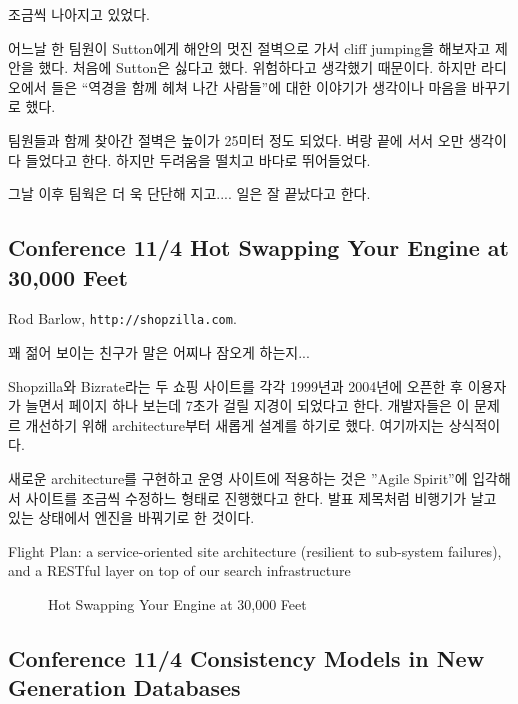\documentclass[a4paper]{article}
\begin{document}
조금씩 나아지고 있었다.
 
어느날 한 팀원이 Sutton에게 해안의 멋진 절벽으로 가서 cliff jumping을
해보자고 제안을 했다. 처음에 Sutton은 싫다고 했다. 위험하다고 생각했기
때문이다.  하지만 라디오에서 들은 ``역경을 함께 헤쳐 나간 사람들''에 대한
이야기가 생각이나 마음을 바꾸기로 했다.
 
팀원들과 함께 찾아간 절벽은 높이가 25미터 정도 되었다. 벼랑 끝에 서서
오만 생각이 다 들었다고 한다. 하지만 두려움을 떨치고 바다로
뛰어들었다.
 
그날 이후 팀웍은 더 욱 단단해 지고.... 일은 잘 끝났다고 한다.
 
\subsection{Conference 11/4 Hot Swapping Your Engine at 30,000 Feet}
 
Rod Barlow, \texttt{http://shopzilla.com}.
 
꽤 젊어 보이는 친구가 말은 어찌나 잠오게 하는지...
 
Shopzilla와 Bizrate라는 두 쇼핑 사이트를 각각 1999년과 2004년에 오픈한
후 이용자가 늘면서 페이지 하나 보는데 7초가 걸릴 지경이 되었다고 한다.
개발자들은 이 문제르 개선하기 위해 architecture부터 새롭게 설계를 하기로 했다.
여기까지는 상식적이다.

새로운 architecture를 구현하고 운영 사이트에 적용하는 것은 ''Agile Spirit''에
입각해서 사이트를 조금씩 수정하느 형태로 진행했다고 한다. 발표 제목처럼
비행기가 날고 있는 상태에서 엔진을 바꿔기로 한 것이다.
 
Flight Plan: a service-oriented site architecture (resilient to
sub-system failures), and a RESTful layer on top of our search
infrastructure

\begin{figure}[t]
    \begin{Frame}
        \begin{center}
        \end{center}
    \end{Frame}
    \caption{Hot Swapping Your Engine at 30,000 Feet}
    \label{swapping engine}
\end{figure}
 
\subsection{Conference 11/4 Consistency Models in New Generation Databases}
 
\end{document}
